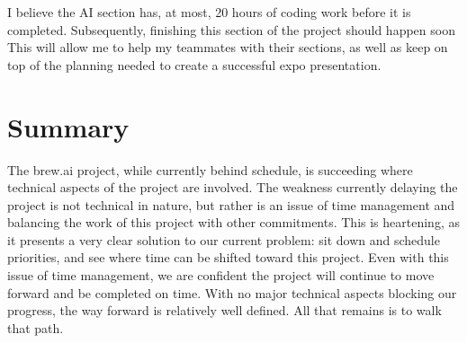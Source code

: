 \documentclass[draftclsnofoot,onecolumn,letterpaper,10pt]{IEEEtran}
\begin{document}
I believe the AI section has, at most, 20 hours of coding work before it is completed.
Subsequently, finishing this section of the project should happen soon
This will allow me to help my teammates with their sections, as well as keep on top of the planning needed to create a successful expo presentation.


\section{Summary}
The brew.ai project, while currently behind schedule, is succeeding where technical aspects of the project are involved.
The weakness currently delaying the project is not technical in nature, but rather is an issue of time management and balancing the work of this project with other commitments.
This is heartening, as it presents a very clear solution to our current problem: sit down and schedule priorities, and see where time can be shifted toward this project.
Even with this issue of time management, we are confident the project will continue to move forward and be completed on time.
With no major technical aspects blocking our progress, the way forward is relatively well defined. All that remains is to walk that path.
\end{document}

